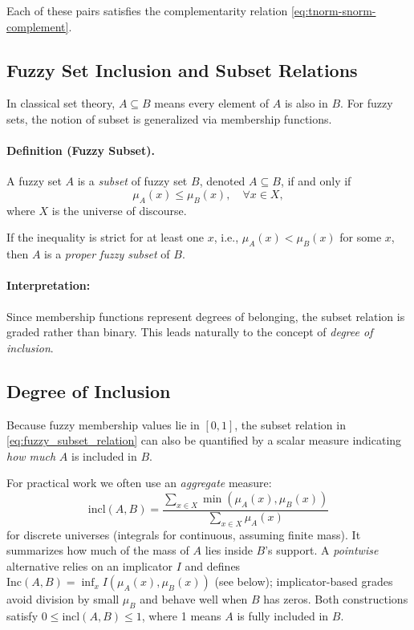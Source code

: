 Each of these pairs satisfies the complementarity relation \eqref{eq:tnorm-snorm-complement}.

\subsection{Fuzzy Set Inclusion and Subset Relations}
\label{sec:fuzzysets_fuzzy_set_inclusion_and_subset_relations}

In classical set theory, \(A \subseteq B\) means every element of \(A\) is also in \(B\). For fuzzy sets, the notion of subset is generalized via membership functions.

\paragraph{Definition (Fuzzy Subset).}
A fuzzy set \(A\) is a \emph{subset} of fuzzy set \(B\), denoted \(A \subseteq B\), if and only if
\begin{equation}
\mu_A(x) \leq \mu_B(x), \quad \forall x \in X,
\label{eq:fuzzy_subset_relation}
\end{equation}
where \(X\) is the universe of discourse.

If the inequality is strict for at least one \(x\), i.e., \(\mu_A(x) < \mu_B(x)\) for some \(x\), then \(A\) is a \emph{proper fuzzy subset} of \(B\).

\paragraph{Interpretation:} Since membership functions represent degrees of belonging, the subset relation is graded rather than binary. This leads naturally to the concept of \emph{degree of inclusion}.

\subsection{Degree of Inclusion}
\label{sec:fuzzysets_degree_of_inclusion}

Because fuzzy membership values lie in \([0,1]\), the subset relation in \eqref{eq:fuzzy_subset_relation} can also be quantified by a scalar measure indicating \emph{how much} \(A\) is included in \(B\).

For practical work we often use an \emph{aggregate} measure:
\begin{equation}
\mathrm{incl}(A, B) = \frac{\sum_{x \in X} \min(\mu_A(x), \mu_B(x))}{\sum_{x \in X} \mu_A(x)}
\label{eq:aggregate_inclusion}
\end{equation}
for discrete universes (integrals for continuous, assuming finite mass). It summarizes how much of the mass of \(A\) lies inside \(B\)'s support. A \emph{pointwise} alternative relies on an implicator \(I\) and defines \(\mathrm{Inc}(A, B)=\inf_x I(\mu_A(x),\mu_B(x))\) (see below); implicator-based grades avoid division by small \(\mu_B\) and behave well when \(B\) has zeros. Both constructions satisfy \(0 \leq \mathrm{incl}(A, B) \leq 1\), where 1 means \(A\) is fully included in \(B\).

